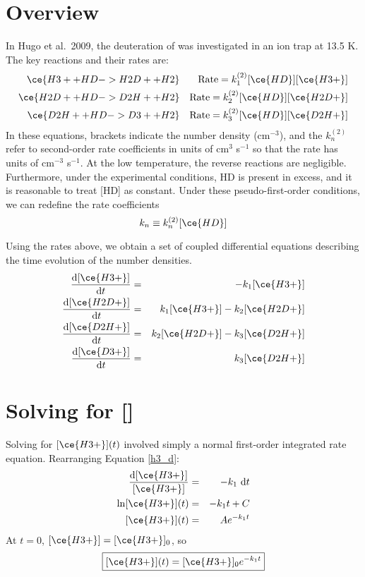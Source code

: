\documentclass[10pt]{article}
\renewcommand{\d}[1]{\ensuremath{\operatorname{d}\!{#1}}}
\begin{document}
\section*{Overview}

In Hugo et al.\ 2009, the deuteration of  was investigated in an ion trap at 13.5 K.
The key reactions and their rates are:
\begin{eqnarray}
 \ce{H3+ + HD -> H2D+ + H2} && \text{Rate} = k_1^{(2)}[\ce{HD}][\ce{H3+}] \\
 \ce{H2D+ + HD -> D2H+ + H2} && \text{Rate} = k_2^{(2)}[\ce{HD}][\ce{H2D+}] \\
 \ce{D2H+ + HD -> D3+ + H2} && \text{Rate} = k_3^{(2)}[\ce{HD}][\ce{D2H+}]
\end{eqnarray}
In these equations, brackets indicate the number density (cm$^{-3}$), and the $k_n^{(2)}$ refer to second-order rate coefficients in units of cm$^{3}$ s$^{-1}$ so that the rate has units of cm$^{-3}$ s$^{-1}$.
At the low temperature, the reverse reactions are negligible.
Furthermore, under the experimental conditions, HD is present in excess, and it is reasonable to treat [HD] as constant.
Under these pseudo-first-order conditions, we can redefine the rate coefficients
\begin{equation}
 k_n \equiv k_n^{(2)}[\ce{HD}]
\end{equation}

Using the rates above, we obtain a set of coupled differential equations describing the time evolution of the number densities.
\begin{eqnarray}
 \frac{\d{[\ce{H3+}]}}{\d{t}} & = & -k_1[\ce{H3+}] \label{h3_d} \\
 \frac{\d{[\ce{H2D+}]}}{\d{t}} & = & k_1[\ce{H3+}] - k_2[\ce{H2D+}] \label{h2d_d}\\
 \frac{\d{[\ce{D2H+}]}}{\d{t}} & = & k_2[\ce{H2D+}] - k_3[\ce{D2H+}] \label{d2h_d}\\
 \frac{\d{[\ce{D3+}]}}{\d{t}} & = & k_3[\ce{D2H+}] \label{d3_d}
\end{eqnarray}

\section*{Solving for []}

Solving for $[\ce{H3+}](t)$ involved simply a normal first-order integrated rate equation.
Rearranging Equation \eqref{h3_d}:
\begin{eqnarray}
 \frac{\d{[\ce{H3+}]}}{[\ce{H3+}]} & = & -k_1\,\d{t} \nonumber \\
 \ln [\ce{H3+}](t) & = & -k_1 t + C \nonumber \\
 {[\ce{H3+}](t)} & = & Ae^{-k_1 t}
\end{eqnarray}
At $t=0$, $[\ce{H3+}] = [\ce{H3+}]_0$, so
\begin{equation}
 \boxed{{[\ce{H3+}](t)} = [\ce{H3+}]_0e^{-k_1 t} \label{h3_i}}
\end{equation}
\end{document}

